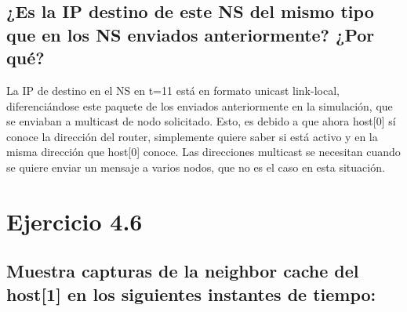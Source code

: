 \subsection{¿Es la IP destino de este NS del mismo tipo que en los NS enviados anteriormente? ¿Por qué?}

La IP de destino en el NS en t=11 está en formato unicast link-local, diferenciándose este paquete de los enviados anteriormente en la simulación, que se enviaban a multicast de nodo solicitado. Esto, es debido a que ahora host[0] sí conoce la dirección del router, simplemente quiere saber si está activo y en la misma dirección que host[0] conoce. Las direcciones multicast se necesitan cuando se quiere enviar un mensaje a varios nodos, que no es el caso en esta situación.


\section{Ejercicio 4.6}
\subsection{Muestra capturas de la neighbor cache del host[1] en los siguientes instantes de tiempo:}

